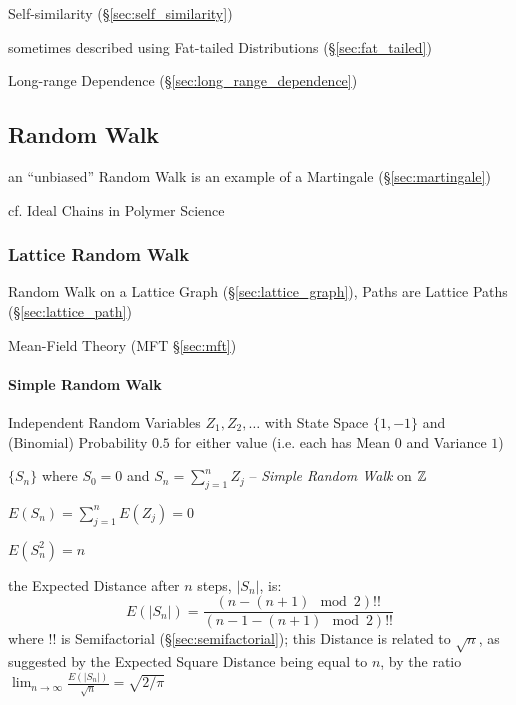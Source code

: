 Self-similarity (\S\ref{sec:self_similarity})

sometimes described using Fat-tailed Distributions (\S\ref{sec:fat_tailed})

Long-range Dependence (\S\ref{sec:long_range_dependence})



\subsection{Random Walk}\label{sec:random_walk}


an ``unbiased'' Random Walk is an example of a Martingale
(\S\ref{sec:martingale})

cf. Ideal Chains in Polymer Science



\subsubsection{Lattice Random Walk}\label{sec:lattice_random_walk}

Random Walk on a Lattice Graph (\S\ref{sec:lattice_graph}), Paths are Lattice
Paths (\S\ref{sec:lattice_path})

\fist Mean-Field Theory (MFT \S\ref{sec:mft})



\paragraph{Simple Random Walk}\label{sec:simple_random_walk}\hfill

Independent Random Variables $Z_1, Z_2, \ldots$ with State Space $\{1, -1\}$ and
(Binomial) Probability $0.5$ for either value (i.e. each has Mean $0$ and
Variance $1$)

$\{ S_n \}$ where $S_0 = 0$ and $S_n = \sum_{j=1}^n Z_j$ --
\emph{Simple Random Walk} on $\mathbb{Z}$

$E(S_n) = \sum_{j=1}^n E(Z_j) = 0$

$E(S_n^2) = n$

the Expected Distance after $n$ steps, $|S_n|$, is:
\[
  E(|S_n|) = \frac{(n - (n+1)\mod{2})!!}{(n - 1 - (n+1)\mod{2})!!}
\]
where $!!$ is Semifactorial (\S\ref{sec:semifactorial}); this Distance is
related to $\sqrt{n}$, as suggested by the Expected Square Distance being equal
to $n$, by the ratio
$\lim_{n\to\infty} \frac{E(|S_n|)}{\sqrt{n}} = \sqrt{2/\pi}$

